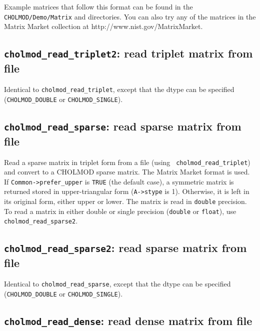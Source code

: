\documentclass[11pt]{article}
\begin{document}
Example matrices that follow this format can be found in the {\tt
CHOLMOD/Demo/Matrix} and  directories.  You
can also try any of the matrices in the Matrix Market collection at
http://www.nist.gov/MatrixMarket.

\subsection{{\tt cholmod\_read\_triplet2}: read triplet matrix from file}


Identical to \verb'cholmod_read_triplet', except that the dtype can be
specified (\verb'CHOLMOD_DOUBLE' or \verb'CHOLMOD_SINGLE').

\subsection{{\tt cholmod\_read\_sparse}: read sparse matrix from file}


Read a sparse matrix in triplet form from a file (using {\tt
cholmod\_read\_triplet}) and convert to a CHOLMOD sparse matrix.  The Matrix
Market format is used.  If {\tt Common->prefer\_upper} is {\tt TRUE} (the
default case), a symmetric matrix is returned stored in upper-triangular form
({\tt A->stype} is 1).  Otherwise, it is left in its original form, either
upper or lower.
%
The matrix is read in {\tt double} precision.  To read a matrix
in either double or single precision ({\tt double} or {\tt float}),
use \verb'cholmod_read_sparse2'.

\subsection{{\tt cholmod\_read\_sparse2}: read sparse matrix from file}


Identical to \verb'cholmod_read_sparse', except that the dtype can be
specified (\verb'CHOLMOD_DOUBLE' or \verb'CHOLMOD_SINGLE').

\subsection{{\tt cholmod\_read\_dense}: read dense matrix from file}
\end{document}
